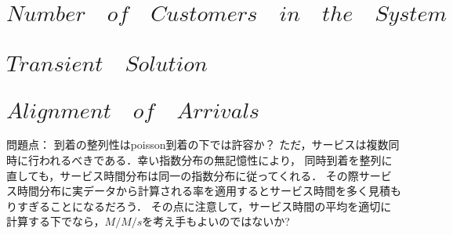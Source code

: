 \documentclass[a4j,papersize,disablejfam,slide,14pt]{jsarticle}
\begin{document}
\section{$Number\quad of\quad Customers\quad in\quad the\quad System$}


\section{$Transient\quad Solution$}

\section{$Alignment\quad of\quad Arrivals$}
	問題点：
	到着の整列性はpoisson到着の下では許容か？
    ただ，サービスは複数同時に行われるべきである．幸い指数分布の無記憶性により，
    同時到着を整列に直しても，サービス時間分布は同一の指数分布に従ってくれる．
    その際サービス時間分布に実データから計算される率を適用するとサービス時間を多く見積もりすぎることになるだろう．
    その点に注意して，サービス時間の平均を適切に計算する下でなら，$M/M/s$を考え手もよいのではないか?


\scriptsize
\end{document}
